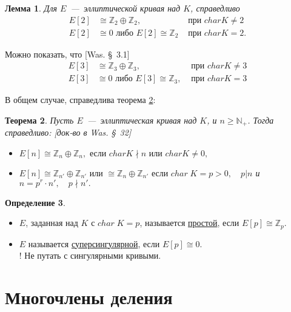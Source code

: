 \documentclass[12pt]{article}
\newcommand{\N}{{{\mathbb N}}}
\newcommand{\Z}{{{\mathbb Z}}}
\newtheorem{theorem}{Теорема}
\newtheorem{lemma}[theorem]{Лемма}
\theoremstyle{definition}
\newtheorem{definition}[theorem]{Определение}
\theoremstyle{definition}
\theoremstyle{definition}
\begin{document}
\begin{lemma}
	\label{lemm_01}
	Для $E$~---~эллиптической кривая над $K$, справедливо
	\begin{align*}
	E\left[ 2 \right] &\cong {\Z_2} \oplus {\Z_2}, &\text{ при }charK \ne 2 \\
	E\left[ 2 \right] &\cong 0 \text{ либо } E\left[ 2 \right] \cong {\Z_2} & \text{ при } char K = 2.
	\end{align*}

\end{lemma}

Можно показать, что [Was. \S~3.1]
    \begin{align*}
    E\left[ 3 \right] &\cong {\Z_3} \oplus {\Z_3}, & {\text{ при }}char K \ne 3 \\
    E\left[ 3 \right] &\cong 0 \text{ либо } E\left[ 3 \right] \cong \Z_3, & {\text{ при }} char K = 3
    \end{align*}

В общем случае, справедлива теорема \ref{theor_02}:

\begin{theorem}
	\label{theor_02}
	Пусть $E$~---~эллиптическая кривая над $K$, и $n \geqslant {\N_+}$. Тогда справедливо: [док-во в Was. \S~32]
	\begin{itemize}
		\item $E\left[ n \right] \cong {\Z_n} \oplus {\Z_n},{\text{ если }} char K \nmid n{\text{ или }}char K \ne 0,$
		
		\item $E\left[ n \right] \cong {\Z_{n'}} \oplus {\Z_{n'}}{\text{ или }} \cong {\Z_n} \oplus {\Z_{n'}}{\text{ если }}char\;K = p > 0,\quad p|n$
		и $n = p^r \cdot n',\quad p \nmid n'.$
	\end{itemize}
\end{theorem}

\begin{definition}
	\label{def_03}
	$ $
	\begin{itemize}
	\item $E$, заданная над $K$ с $char\;K = p$, называется \underline{простой}, если $E[p] \cong {\Z_p}$.

	\item $E$ называется \underline{суперсингулярной}, если $E[p] \cong 0$.\\
	! Не путать с сингулярными кривыми.
	\end{itemize}
\end{definition}

\section{Многочлены деления}
\end{document}
